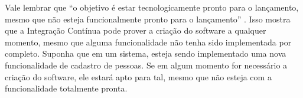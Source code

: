 Vale lembrar que ``o objetivo é estar tecnologicamente pronto para o lançamento, mesmo que não esteja funcionalmente pronto para o lançamento'' \cite{SHORE}. Isso mostra que a Integração Contínua pode prover a criação do software a qualquer momento, mesmo que alguma funcionalidade não tenha sido implementada por completo. Suponha que em um sistema, esteja sendo implementado uma nova funcionalidade de cadastro de pessoas. Se em algum momento for necessário a criação do software, ele estará apto para tal, mesmo que não esteja com a funcionalidade totalmente pronta.
